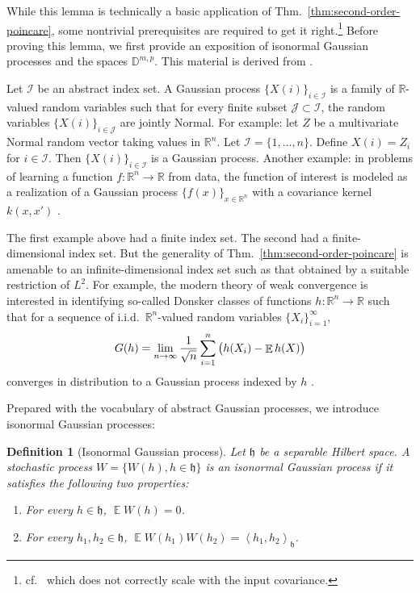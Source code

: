 \documentclass{article}
\newtheorem{definition}{Definition}
\DeclareMathOperator{\expect}{\mathbb{E}}
\begin{document}
While this lemma is technically a basic application of Thm.~\ref{thm:second-order-poincare}, some nontrivial prerequisites are required to get it right.\footnote{cf.~\citet{karvonen_wasserstein_2025} which does not correctly scale with the input covariance.}
Before proving this lemma, we first provide an exposition of isonormal Gaussian processes and the spaces \( \mathbb{D}^{m, p}\).
This material is derived from \citet{nualart_malliavin_2006,nourdin_multivariate_2010}.

Let \(\mathcal I\) be an abstract index set.
A Gaussian process \(\{X(i)\}_{i \in \mathcal I}\) is a family of \(\mathbb{R}\)-valued random variables
such that for every finite subset \(\mathcal J \subset \mathcal I\),
the random variables \(\{X(i)\}_{i \in \mathcal J}\) are jointly Normal.
For example: let \(Z\) be a multivariate Normal random vector taking values in \(\mathbb{R}^n\).
  Let \(\mathcal I = \{1, \dots, n\}\).
  Define \(X(i) = Z_i\) for \(i \in \mathcal I\).
  Then \(\{X(i)\}_{i \in \mathcal I}\) is a Gaussian process.
Another example:
in problems of learning a function \(f:\mathbb{R}^n \to \mathbb{R}\) from data, 
the function of interest is modeled as a realization of a Gaussian process \(\{f(x)\}_{x \in \mathbb{R}^n}\) with a covariance kernel \(k(x, x')\) \citep{stein_interpolation_1999,rasmussen_gaussian_2008}.

The first example above had a finite index set. The second had a finite-dimensional index set.
But the generality of Thm.~\ref{thm:second-order-poincare} is amenable to an infinite-dimensional index set such as that obtained by a suitable restriction of \(L^2\).
For example, the modern theory of weak convergence is interested in identifying so-called Donsker classes of functions \(h : \mathbb{R}^n \to \mathbb{R}\) such that for a sequence of i.i.d.~\(\mathbb{R}^n\)-valued random variables \(\{X_i\}_{i = 1}^\infty\),
\begin{align*}
  G(h) = \lim_{n \to \infty} \frac{1}{\sqrt n} \sum_{i = 1}^n \del{h(X_i) - \expect h(X)}
\end{align*}
converges in distribution to a Gaussian process indexed by \(h\) \citep{van_der_vaart_weak_1996}.

Prepared with the vocabulary of abstract Gaussian processes, we introduce isonormal Gaussian processes:
\begin{definition}[Isonormal Gaussian process]
  Let $\mathfrak{h}$ be a separable Hilbert space. A stochastic process $W = \{W(h), h \in \mathfrak{h}\}$ is an isonormal Gaussian process if it satisfies the following two properties:
  \begin{enumerate}
    \item For every $h \in \mathfrak{h}$, $\expect W(h) = 0$.
    \item For every $h_1, h_2 \in \mathfrak{h}$, $\expect W(h_1) W(h_2) = \left\langle h_1, h_2 \right\rangle_\mathfrak{h}$.
  \end{enumerate}
\end{definition}
\end{document}
